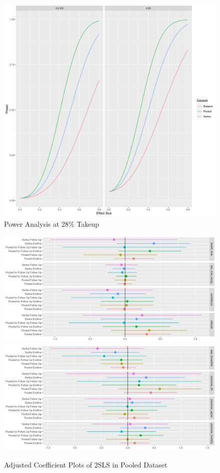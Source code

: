 \documentclass{article}
\begin{document}
\begin{figure}[H]
  \includegraphics[width=1.0\textwidth]{plots/Power Calculations.png}
  \caption{Power Analysis at 28\% Takeup}
  \label{fig:Power Analysis}
\end{figure}

\clearpage


\begin{figure}[H]
\includegraphics[width=\textwidth]{plots/Adjusted Coefficient Plot Knowledge and Attitudes.png}
\includegraphics[width=\textwidth]{plots/Adjusted Coefficient Plot Practices.png}
\caption{Adjusted Coefficient Plots of 2SLS in Pooled Dataset}
\end{figure}
\end{document}
